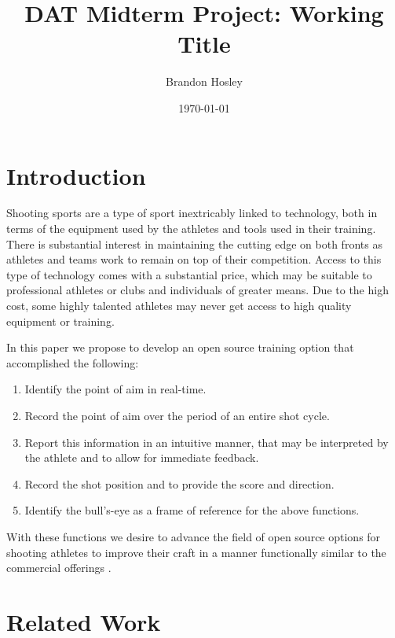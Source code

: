 \documentclass[conference]{IEEEtran}
\title{DAT Midterm Project: Working Title}
\author{Brandon Hosley}
\date{\today}
\begin{document}
	\maketitle
	
\begin{abstract}
\end{abstract}

\section{Introduction}

Shooting sports are a type of sport inextricably linked to technology, 
both in terms of the equipment used by the athletes and tools used in their training.
There is substantial interest in maintaining the cutting edge on both fronts as athletes and teams work to remain on top of their competition.
Access to this type of technology comes with a substantial price, which may be suitable to professional athletes or clubs and individuals of greater means.
Due to the high cost, some highly talented athletes may never get access to high quality equipment or training.

In this paper we propose to develop an open source training option that accomplished the following:

\begin{enumerate}
	\item Identify the point of aim in real-time.
	\item Record the point of aim over the period of an entire shot cycle.
	\item Report this information in an intuitive manner, that may be interpreted by the athlete and to allow for immediate feedback.
	
	\item Record the shot position and to provide the score and direction.
	\item Identify the bull's-eye as a frame of reference for the above functions.
\end{enumerate}

With these functions we desire to advance the field of open source options for shooting athletes to improve their craft in a manner functionally similar to the commercial offerings \cite{scatt} \cite{noptel}.

\section{Related Work}
\end{document}
